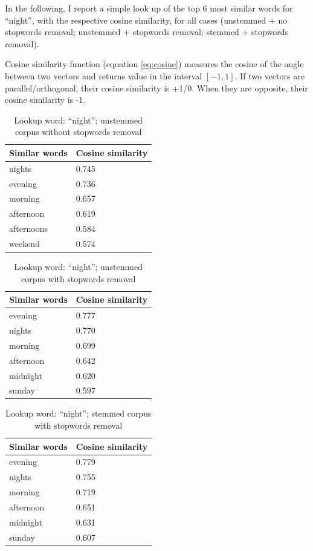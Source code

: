 In the following, I report a simple look up of the top 6 most similar words for ``night'', with the respective cosine similarity, for all cases (unstemmed + no stopwords removal; unstemmed + stopwords removal; stemmed + stopwords removal).

Cosine similarity function (equation \ref{eq:cosine}) measures the cosine of the angle between two vectors and returns value in the interval $[-1, 1]$. If two vectors are parallel/orthogonal, their cosine similarity is +1/0. When they are opposite, their cosine similarity is -1.

\begin{table}[H]
\centering
\begin{tabular}{ll}
\textbf{Similar words} & \textbf{Cosine similarity} \\ \hline  
nights & 0.745 \\
evening & 0.736\\
morning & 0.657 \\
afternoon & 0.619 \\
afternoons & 0.584 \\
weekend & 0.574 \\
\end{tabular}
\caption{Lookup word: ``night''; unstemmed corpus without stopwords removal}
\end{table}

\begin{table}[H]
\centering
\begin{tabular}{ll}
\textbf{Similar words} & \textbf{Cosine similarity} \\ \hline  
evening & 0.777 \\
nights & 0.770 \\
morning & 0.699 \\
afternoon & 0.642 \\
midnight & 0.620 \\
sunday & 0.597 \\
\end{tabular}
\caption{Lookup word: ``night''; unstemmed corpus with stopwords removal}
\end{table}

\begin{table}[H]
\centering
\begin{tabular}{ll}
\textbf{Similar words} & \textbf{Cosine similarity} \\ \hline  
evening & 0.779 \\
nights & 0.755 \\
morning & 0.719 \\
afternoon & 0.651 \\
midnight & 0.631 \\
sunday & 0.607 \\
\end{tabular}
\caption{Lookup word: ``night''; stemmed corpus with stopwords removal}
\end{table}

